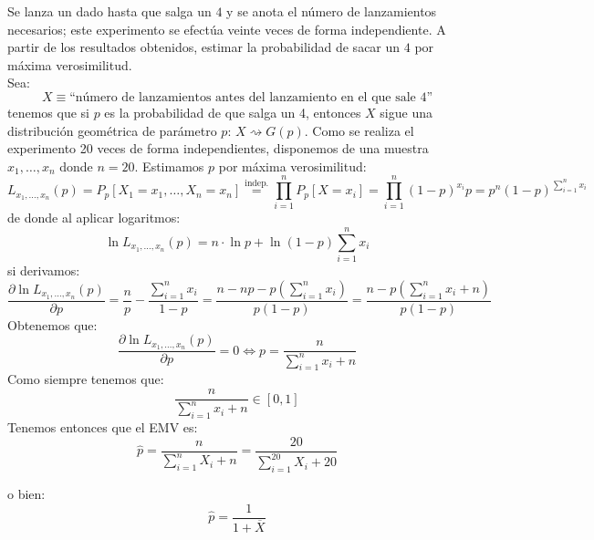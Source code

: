 \begin{ejercicio}\label{ej:5_rel5}
    Se lanza un dado hasta que salga un $4$ y se anota el número de lanzamientos necesarios; este experimento se efectúa veinte veces de forma independiente. A partir de los resultados obtenidos, estimar la probabilidad de sacar un $4$ por máxima verosimilitud.\\

    \noindent
    Sea:
    \begin{equation*}
        X \equiv \text{``número de lanzamientos antes del lanzamiento en el que sale 4''}
    \end{equation*}
    tenemos que si $p$ es la probabilidad de que salga un 4, entonces $X$ sigue una distribución geométrica de parámetro $p$: $X\rightsquigarrow G(p)$. Como se realiza el experimento 20 veces de forma independientes, disponemos de una muestra $x_1, \ldots, x_n$ donde $n=20$. Estimamos $p$ por máxima verosimilitud:
    \begin{equation*}
        L_{x_1,\ldots,x_{n}}(p) = P_p[X_1 =x_1, \ldots, X_n=x_n] \stackrel{\text{indep.}}{=} \prod_{i=1}^{n} P_p[X=x_i] = \prod_{i=1}^{n} {(1-p)}^{x_i}p = p^{n}{(1-p)}^{\sum\limits_{i=1}^{n}x_i}
    \end{equation*}
    de donde al aplicar logaritmos:
    \begin{equation*}
        \ln L_{x_1,\ldots,x_n}(p) = n\cdot \ln p + \ln(1-p)\sum_{i=1}^{n}x_i
    \end{equation*}
    si derivamos:
    \begin{equation*}
        \dfrac{\partial \ln L_{x_1,\ldots,x_n}(p)}{\partial p} = \frac{n}{p} - \frac{\sum\limits_{i=1}^{n}x_i}{1-p} = \frac{n - np - p\left(\sum\limits_{i=1}^{n}x_i\right)}{p(1-p)} = \frac{n - p\left(\sum\limits_{i=1}^{n}x_i +n\right)}{p(1-p)}
    \end{equation*}
    Obtenemos que:
    \begin{equation*}
        \dfrac{\partial \ln L_{x_1,\ldots,x_n}(p)}{\partial  p} = 0 \Longleftrightarrow p = \frac{n}{\sum\limits_{i=1}^{n}x_i + n}
    \end{equation*}
    Como siempre tenemos que:
    \begin{equation*}
        \frac{n}{\sum\limits_{i=1}^{n}x_i + n} \in [0,1] 
    \end{equation*}
    Tenemos entonces que el EMV es:
    \begin{equation*}
        \hat{p} = \frac{n}{\sum\limits_{i=1}^{n}X_i+n} = \frac{20}{\sum\limits_{i=1}^{20}X_i+20}
    \end{equation*}

    o bien:
    \begin{equation*}
        \hat{p} = \frac{1}{1+\overline{X}}
    \end{equation*}
\end{ejercicio}

